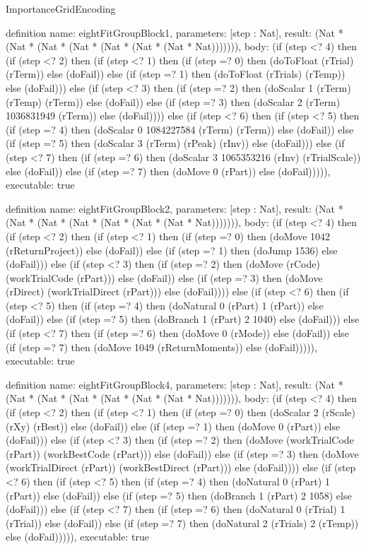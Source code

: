 \begin{lexlean}{ImportanceGridEncoding}
\begin{semanticmodule}
definition{
  name: eightFitGroupBlock1,
  parameters: [step : Nat],
  result: (Nat * (Nat * (Nat * (Nat * (Nat * (Nat * (Nat * Nat))))))),
  body: (if (step <? 4) then
      (if (step <? 2) then
      (if (step <? 1) then
      (if (step =? 0) then (doToFloat (rTrial) (rTerm)) else (doFail)) else
      (if (step =? 1) then (doToFloat (rTrials) (rTemp)) else (doFail))) else
      (if (step <? 3) then
      (if (step =? 2) then (doScalar 1 (rTerm) (rTemp) (rTerm)) else (doFail)) else
      (if (step =? 3) then (doScalar 2 (rTerm) 1036831949 (rTerm)) else (doFail)))) else
      (if (step <? 6) then
      (if (step <? 5) then
      (if (step =? 4) then (doScalar 0 1084227584 (rTerm) (rTerm)) else (doFail)) else
      (if (step =? 5) then (doScalar 3 (rTerm) (rPeak) (rInv)) else (doFail))) else
      (if (step <? 7) then
      (if (step =? 6) then (doScalar 3 1065353216 (rInv) (rTrialScale)) else (doFail)) else
      (if (step =? 7) then (doMove 0 (rPart)) else (doFail))))),
  executable: true
}

definition{
  name: eightFitGroupBlock2,
  parameters: [step : Nat],
  result: (Nat * (Nat * (Nat * (Nat * (Nat * (Nat * (Nat * Nat))))))),
  body: (if (step <? 4) then
      (if (step <? 2) then
      (if (step <? 1) then
      (if (step =? 0) then (doMove 1042 (rReturnProject)) else (doFail)) else
      (if (step =? 1) then (doJump 1536) else (doFail))) else
      (if (step <? 3) then
      (if (step =? 2) then (doMove (rCode) (workTrialCode (rPart))) else (doFail)) else
      (if (step =? 3) then (doMove (rDirect) (workTrialDirect (rPart))) else (doFail)))) else
      (if (step <? 6) then
      (if (step <? 5) then
      (if (step =? 4) then (doNatural 0 (rPart) 1 (rPart)) else (doFail)) else
      (if (step =? 5) then (doBranch 1 (rPart) 2 1040) else (doFail))) else
      (if (step <? 7) then
      (if (step =? 6) then (doMove 0 (rMode)) else (doFail)) else
      (if (step =? 7) then (doMove 1049 (rReturnMoments)) else (doFail))))),
  executable: true
}

definition{
  name: eightFitGroupBlock4,
  parameters: [step : Nat],
  result: (Nat * (Nat * (Nat * (Nat * (Nat * (Nat * (Nat * Nat))))))),
  body: (if (step <? 4) then
      (if (step <? 2) then
      (if (step <? 1) then
      (if (step =? 0) then (doScalar 2 (rScale) (rXy) (rBest)) else (doFail)) else
      (if (step =? 1) then (doMove 0 (rPart)) else (doFail))) else
      (if (step <? 3) then
      (if (step =? 2) then (doMove (workTrialCode (rPart)) (workBestCode (rPart))) else (doFail)) else
      (if (step =? 3) then (doMove (workTrialDirect (rPart)) (workBestDirect (rPart))) else (doFail)))) else
      (if (step <? 6) then
      (if (step <? 5) then
      (if (step =? 4) then (doNatural 0 (rPart) 1 (rPart)) else (doFail)) else
      (if (step =? 5) then (doBranch 1 (rPart) 2 1058) else (doFail))) else
      (if (step <? 7) then
      (if (step =? 6) then (doNatural 0 (rTrial) 1 (rTrial)) else (doFail)) else
      (if (step =? 7) then (doNatural 2 (rTrials) 2 (rTemp)) else (doFail))))),
  executable: true
}


\end{semanticmodule}
\end{lexlean}
